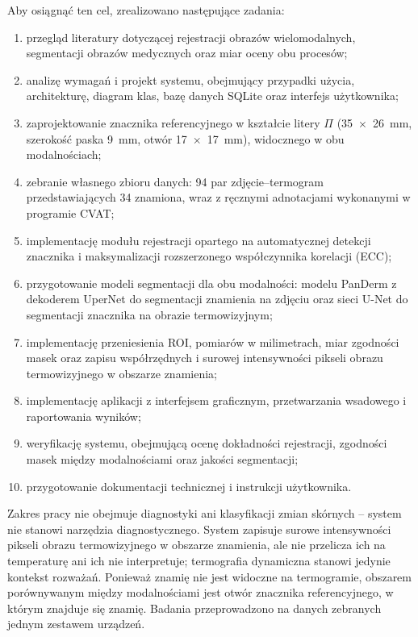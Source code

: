 Aby osiągnąć ten cel, zrealizowano następujące zadania:
\begin{enumerate}
  \item przegląd literatury dotyczącej rejestracji obrazów wielomodalnych, segmentacji obrazów medycznych oraz miar oceny obu procesów;
  \item analizę wymagań i projekt systemu, obejmujący przypadki użycia, architekturę, diagram klas, bazę danych SQLite oraz interfejs użytkownika;
  \item zaprojektowanie znacznika referencyjnego w kształcie litery $\Pi$ (35~$\times$~26~mm, szerokość paska 9~mm, otwór 17~$\times$~17~mm), widocznego w obu modalnościach;
  \item zebranie własnego zbioru danych: 94 par zdjęcie--termogram przedstawiających 34 znamiona, wraz z ręcznymi adnotacjami wykonanymi w programie CVAT;
  \item implementację modułu rejestracji opartego na automatycznej detekcji znacznika i maksymalizacji rozszerzonego współczynnika korelacji (ECC);
  \item przygotowanie modeli segmentacji dla obu modalności: modelu PanDerm z dekoderem UperNet do segmentacji znamienia na zdjęciu oraz sieci U-Net do segmentacji znacznika na obrazie termowizyjnym;
  \item implementację przeniesienia ROI, pomiarów w milimetrach, miar zgodności masek oraz zapisu współrzędnych i surowej intensywności pikseli obrazu termowizyjnego w obszarze znamienia;
  \item implementację aplikacji z interfejsem graficznym, przetwarzania wsadowego i raportowania wyników;
  \item weryfikację systemu, obejmującą ocenę dokładności rejestracji, zgodności masek między modalnościami oraz jakości segmentacji;
  \item przygotowanie dokumentacji technicznej i instrukcji użytkownika.
\end{enumerate}

Zakres pracy nie obejmuje diagnostyki ani klasyfikacji zmian skórnych -- system nie stanowi narzędzia diagnostycznego. System zapisuje surowe intensywności pikseli obrazu termowizyjnego w obszarze znamienia, ale nie przelicza ich na temperaturę ani ich nie interpretuje; termografia dynamiczna stanowi jedynie kontekst rozważań.
Ponieważ znamię nie jest widoczne na termogramie, obszarem porównywanym między modalnościami jest otwór znacznika referencyjnego, w którym znajduje się znamię. Badania przeprowadzono na danych zebranych jednym zestawem urządzeń.

